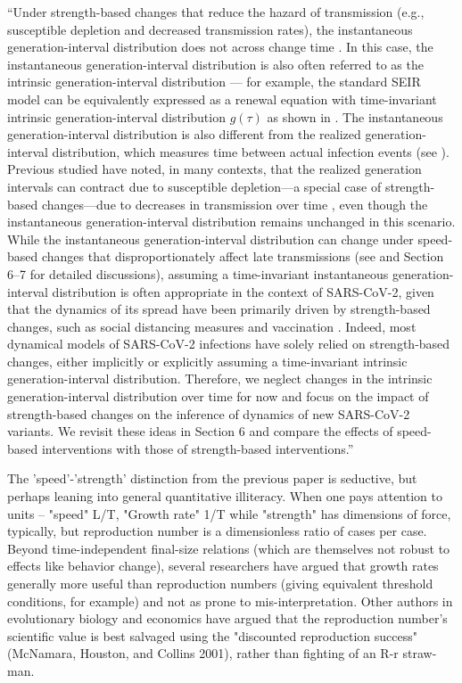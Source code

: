 \documentclass[12pt]{article}
\newcommand{\revtext}{\textsf}
\begin{document}
``Under strength-based changes that reduce the hazard of transmission (e.g., susceptible depletion and decreased transmission rates), the instantaneous generation-interval distribution does not across change time \citep{fraser2007estimating}.
In this case, the instantaneous generation-interval distribution is also often referred to as the intrinsic generation-interval distribution \citep{champredon2015intrinsic,champredon2018two,gostic2020practical,park2020time}---
for example, the standard SEIR model can be equivalently expressed as a renewal equation with time-invariant intrinsic generation-interval distribution $g(\tau)$ as shown in \citep{champredon2018equivalence}.
The instantaneous generation-interval distribution is also different from the realized generation-interval distribution, which measures time between actual infection events (see \citep{champredon2015intrinsic}).
Previous studied have noted, in many contexts, that the realized generation intervals can contract due to susceptible depletion---a special case of strength-based changes---due to decreases in transmission over time \citep{kenah2008generation,nishiura2010time,champredon2015intrinsic}, even though the instantaneous generation-interval distribution remains unchanged in this scenario.
While the instantaneous generation-interval distribution can change under speed-based changes that disproportionately affect late transmissions (see \cite{fraser2007estimating} and Section 6--7 for detailed discussions), assuming a time-invariant instantaneous generation-interval distribution is often appropriate in the context of SARS-CoV-2, given that the dynamics of its spread have been primarily driven by strength-based changes, such as social distancing measures \citep{flaxman2020Rt} and vaccination \citep{moore2021vaccination}.
Indeed, most dynamical models of SARS-CoV-2 infections have solely relied on strength-based changes, either implicitly or explicitly assuming a time-invariant intrinsic generation-interval distribution.
Therefore, we neglect changes in the intrinsic generation-interval distribution over time for now and focus on the impact of strength-based changes on the inference of dynamics of new SARS-CoV-2 variants.
We revisit these ideas in Section 6 and compare the effects of speed-based interventions with those of strength-based interventions.''

\revtext{The 'speed'-'strength' distinction from the previous paper is seductive, but perhaps leaning into general quantitative illiteracy.  When one pays attention to units -- "speed" L/T,  "Growth rate" 1/T while "strength" has dimensions of force, typically, but reproduction number is a dimensionless ratio of cases per case.  Beyond time-independent final-size relations (which are themselves not robust to effects like behavior change), several researchers have argued that growth rates generally more useful than reproduction numbers (giving equivalent threshold conditions, for example) and not as prone to mis-interpretation.  Other authors in evolutionary biology and economics have argued that the reproduction number's scientific value is best salvaged using the "discounted reproduction success" (McNamara, Houston, and Collins 2001), rather than fighting of an R-r straw-man.}
\end{document}
